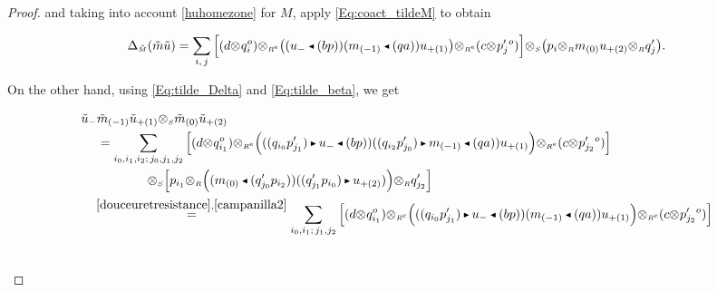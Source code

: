 \documentclass[reqno, a4paper, 10pt]{amsart}
\numberwithin{equation}{section}
\theoremstyle{plain}
\theoremstyle{definition}
\theoremstyle{remark}
\begin{document}
\begin{proof}
and taking into account \eqref{huhomezone} for $M$,  apply \eqref{Eq:coact_tildeM} to obtain
\begin{footnotesize}
$$
\Delta_{{\tilde{{\scriptscriptstyle{M}}}}}({\tilde{{m}}}{\tilde{{u}}}) = \sum_{i,\, j} {\left[\underset{}{} {(d{\otimes_{\scriptscriptstyle{{}}}}q_i^o){\otimes_{\scriptscriptstyle{{\scriptscriptstyle{{R^{\rm e}}}}}}}{\big( {(u_-{{\,\raise1pt\hbox{$\scriptscriptstyle{\blacktriangleleft}$} \, }}(bp))(m_{(-1)}{{\,\raise1pt\hbox{$\scriptscriptstyle{\blacktriangleleft}$} \, }}(qa))u_{+(1)}} \big)} {\otimes_{\scriptscriptstyle{{\scriptscriptstyle{{R^{\rm e}}}}}}} (c{\otimes_{\scriptscriptstyle{{}}}}p_j'{}^o)} \right]} {\otimes_{\scriptscriptstyle{{S}}}} {\big( {p_i{\otimes_{\scriptscriptstyle{{R}}}}m_{(0)}u_{+(2)}{\otimes_{\scriptscriptstyle{{R}}}}q_j'} \big)}.
$$
\end{footnotesize}
On the other hand, using \eqref{Eq:tilde_Delta} and \eqref{Eq:tilde_beta}, 
we get 
\begin{footnotesize}
\begin{equation*}
\begin{split}
{\tilde{{u}}}_- & {\tilde{{m}}}_{(-1)}{\tilde{{u}}}_{+(1)}{\otimes_{\scriptscriptstyle{{S}}}}{\tilde{{m}}}_{(0)}{\tilde{{u}}}_{+(2)} \\
& = \sum_{i_0, i_1, i_2; \, j_0, j_1,j_2} {\left[\underset{}{} { (d{\otimes_{\scriptscriptstyle{{}}}}q_{i_1}^o){\otimes_{\scriptscriptstyle{{\scriptscriptstyle{{R^{\rm e}}}}}}}\Big(((q_{i_0}p_{j_1}'){{\,\raise1pt\hbox{$\scriptscriptstyle{\blacktriangleright}$} \, }} u_-{{\,\raise1pt\hbox{$\scriptscriptstyle{\blacktriangleleft}$} \, }}(bp))((q_{i_2}p_{j_0}'){{\,\raise1pt\hbox{$\scriptscriptstyle{\blacktriangleright}$} \, }} m_{(-1)} {{\,\raise1pt\hbox{$\scriptscriptstyle{\blacktriangleleft}$} \, }} (qa))u_{+(1)}\Big){\otimes_{\scriptscriptstyle{{\scriptscriptstyle{{R^{\rm e}}}}}}} (c{\otimes_{\scriptscriptstyle{{}}}}p_{j_2}'{}^o)} \right]} \\ & \qquad \qquad
 {\otimes_{\scriptscriptstyle{{S}}}}{\left[\underset{}{} { p_{i_1}{\otimes_{\scriptscriptstyle{{R}}}} \Big( (m_{(0)}{{\,\raise1pt\hbox{$\scriptscriptstyle{\blacktriangleleft}$} \, }}(q'_{j_0}p_{i_2}))((q'_{j_1}p_{i_0}){{\,\raise1pt\hbox{$\scriptscriptstyle{\blacktriangleright}$} \, }} u_{+(2)})\Big){\otimes_{\scriptscriptstyle{{R}}}}q_{j_2}' } \right]} \\
& \!\! \overset{\eqref{douceuretresistance},\eqref{campanilla2}}{=}  
\sum_{i_0, i_1; \,  j_1,j_2} {\left[\underset{}{} { (d{\otimes_{\scriptscriptstyle{{}}}}q_{i_1}^o){\otimes_{\scriptscriptstyle{{\scriptscriptstyle{{R^{\rm e}}}}}}}\Big(((q_{i_0}p_{j_1}'){{\,\raise1pt\hbox{$\scriptscriptstyle{\blacktriangleright}$} \, }} u_-{{\,\raise1pt\hbox{$\scriptscriptstyle{\blacktriangleleft}$} \, }}(bp))(m_{(-1)} {{\,\raise1pt\hbox{$\scriptscriptstyle{\blacktriangleleft}$} \, }} (qa))u_{+(1)}\Big){\otimes_{\scriptscriptstyle{{\scriptscriptstyle{{R^{\rm e}}}}}}} (c{\otimes_{\scriptscriptstyle{{}}}}p_{j_2}'{}^o)} \right]} \\ & \qquad \qquad

\end{split}
\end{equation*}
\end{footnotesize}
\end{proof}
\end{document}

